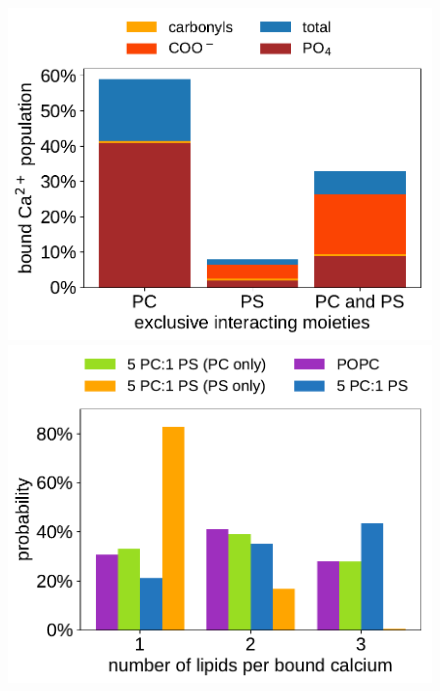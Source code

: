 \documentclass[journal=jpcbfk,manuscript=article]{achemso}
\newlength{\figwidth}
\newlength{\figwidthsmall}
\begin{document}

\begin{figure}[tb!] 
  \centering 
  \includegraphics[width=\figwidthsmall]{../img/bound_ca_populations.pdf} 
  \includegraphics[width=\figwidthsmall]{../img/stoichiometry_CaCl2_comparison_Ecc-lipids_PC-vs-PCPS.pdf} \\ 

\end{figure}
\end{document}
